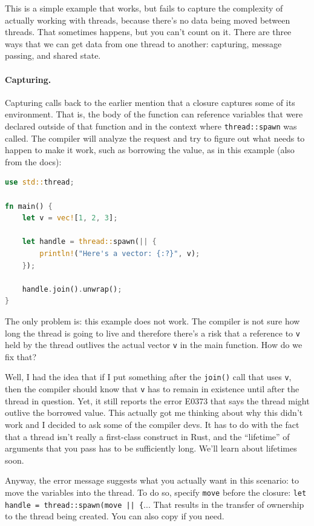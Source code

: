 \documentclass[a4paper]{report}
\begin{document}
This is a simple example that works, but fails to capture the complexity of actually working with threads, because there's no data being moved between threads. That sometimes happens, but you can't count on it. There are three ways that we can get data from one thread to another: capturing, message passing, and shared state.

\paragraph{Capturing.} 
Capturing calls back to the earlier mention that a closure captures some of its environment. That is, the body of the function can reference variables that were declared outside of that function and in the context where \texttt{thread::spawn} was called. The compiler will analyze the request and try to figure out what needs to happen to make it work, such as borrowing the value, as in this example (also from the docs):

\begin{lstlisting}[language=Rust]
use std::thread;

fn main() {
    let v = vec![1, 2, 3];

    let handle = thread::spawn(|| {
        println!("Here's a vector: {:?}", v);
    });

    handle.join().unwrap();
}
\end{lstlisting}

The only problem is: this example does not work. The compiler is not sure how long the thread is going to live and therefore there's a risk that a reference to \texttt{v} held by the thread outlives the actual vector \texttt{v} in the main function. How do we fix that?

Well, I had the idea that if I put something after the \texttt{join()} call that uses \texttt{v}, then the compiler should know that \texttt{v} has to remain in existence until after the thread in question. Yet, it still reports the error E0373 that says the thread might outlive the borrowed value. This actually got me thinking about why this didn't work and I decided to ask some of the compiler devs. It has to do with the fact that a thread isn't really a first-class construct in Rust, and the ``lifetime'' of arguments that you pass has to be sufficiently long. We'll learn about lifetimes soon.

Anyway, the error message suggests what you actually want in this scenario: to move the variables into the thread. To do so, specify \texttt{move} before the closure: \texttt{let handle = thread::spawn(move || \{}... That results in the transfer of ownership to the thread being created. You can also copy if you need.
\end{document}
